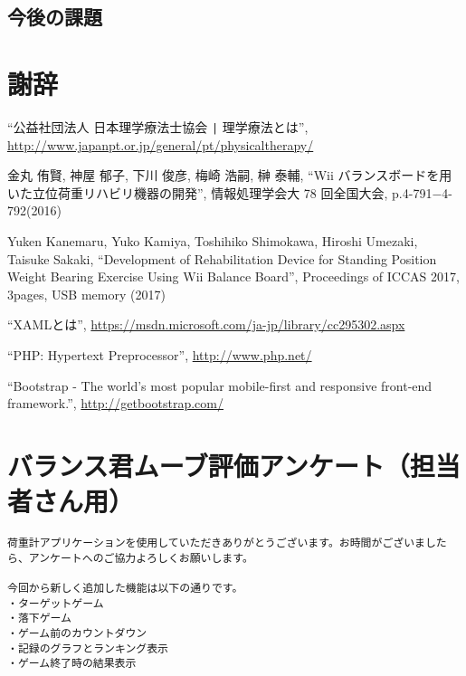 \documentclass[a4j,12pt,onecolumn,oneside,titlepage,openany,final]{jreport}
\begin{document}
\section{今後の課題}\label{sec:kadai}



\chapter*{謝辞}



\begin{thebibliography}{99}%

   ``公益社団法人 日本理学療法士協会 \verb+|+ 理学療法とは'',
  \url{http://www.japanpt.or.jp/general/pt/physicaltherapy/}
    
   金丸 侑賢, 神屋 郁子, 下川 俊彦, 梅崎 浩嗣, 榊 泰輔,
  ``Wii バランスボードを用いた立位荷重リハビリ機器の開発'', 
  情報処理学会大 78 回全国大会, p.4-791$−$4-792(2016)         

   Yuken Kanemaru, Yuko Kamiya, Toshihiko Shimokawa, Hiroshi Umezaki, Taisuke Sakaki, 
  ``Development of Rehabilitation Device for Standing Position Weight Bearing Exercise Using Wii Balance Board'',
  Proceedings of ICCAS 2017, 3pages, USB memory (2017)    

   ``XAMLとは'',
  \url{https://msdn.microsoft.com/ja-jp/library/cc295302.aspx}

   ``PHP: Hypertext Preprocessor'',
  \url{ http://www.php.net/ }

   ``Bootstrap - The world's most popular mobile-first and responsive front-end framework.'',      
  \url{ http://getbootstrap.com/ }

\end{thebibliography}


\appendix

\chapter{バランス君ムーブ評価アンケート（担当者さん用）}\label{h:tantou}

\begin{verbatim}
荷重計アプリケーションを使用していただきありがとうございます。お時間がございましたら、アンケートへのご協力よろしくお願いします。

今回から新しく追加した機能は以下の通りです。
・ターゲットゲーム
・落下ゲーム
・ゲーム前のカウントダウン
・記録のグラフとランキング表示
・ゲーム終了時の結果表示
\end{verbatim}
\end{document}
